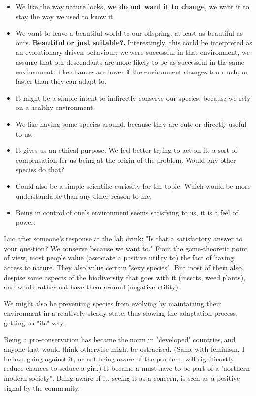 \documentclass[12pt]{article}
\begin{document}
\begin{itemize}
    \item We like the way nature looks, \textbf{we do not want it to change}, we want it to stay the way we used to know it.
    \item We want to leave a beautiful world to our offspring, at least as beautiful as ours. \textbf{Beautiful or just suitable?.} Interestingly, this could be interpreted as an evolutionary-driven behaviour; we were successful in that environment, we assume that our descendants are more likely to be as successful in the same environment. The chances are lower if the environment changes too much, or faster than they can adapt to.
    \item It might be a simple intent to indirectly conserve our species, because we rely on a healthy environment.
    \item We like having some species around, because they are cute or directly useful to us.
    \item It gives us an ethical purpose. We feel better trying to act on it, a sort of compensation for us being at the origin of the problem. Would any other species do that?
    \item Could also be a simple scientific curiosity for the topic. Which would be more understandable than any other reason to me.
    \item Being in control of one's environment seems satisfying to us, it is a feel of power.
\end{itemize}

Luc after someone's response at the lab drink: "Is that a satisfactory answer to your question? We conserve because we want to."
From the game-theoretic point of view, most people value (associate a positive utility to) the fact of having access to nature. They also value certain "sexy species".
But most of them also despise some aspects of the biodiversity that goes with it (insects, weed plants), and would rather not have them around (negative utility).

We might also be preventing species from evolving by maintaining their environment in a relatively steady state, thus slowing the adaptation process, getting on "its" way.

Being a pro-conservation has became the norm in "developed" countries, and anyone that would think otherwise might be ostracised.
(Same with feminism, I believe going against it, or not being aware of the problem, will significantly reduce chances to seduce a girl.)
It became a must-have to be part of a "northern modern society".
Being aware of it, seeing it as a concern, is seen as a positive signal by the community.
\end{document}
